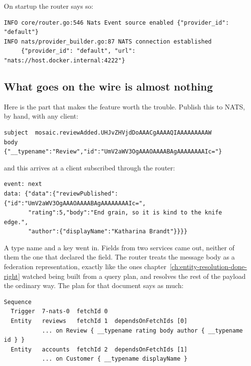 On startup the router says so:

\begin{verbatim}
INFO core/router.go:546 Nats Event source enabled {"provider_id": "default"}
INFO nats/provider_builder.go:87 NATS connection established
     {"provider_id": "default", "url": "nats://host.docker.internal:4222"}
\end{verbatim}

\subsection*{What goes on the wire is almost nothing}

%
Here is the part that makes the feature worth the trouble. Publish this to
NATS, by hand, with any client:

\begin{verbatim}
subject  mosaic.reviewAdded.UHJvZHVjdDoAAACgAAAAQIAAAAAAAAAW
body     {"__typename":"Review","id":"UmV2aWV3OgAAAOAAAABAgAAAAAAAAIc="}
\end{verbatim}

and this arrives at a client subscribed through the router:

\begin{verbatim}
event: next
data: {"data":{"reviewPublished":{"id":"UmV2aWV3OgAAAOAAAABAgAAAAAAAAIc=",
       "rating":5,"body":"End grain, so it is kind to the knife edge.",
       "author":{"displayName":"Katharina Brandt"}}}}
\end{verbatim}

A type name and a key went in. Fields from two services came out, neither of
them the one that declared the field. The router treats the message body as a
federation representation, exactly like the ones
chapter~\ref{ch:entity-resolution-done-right} watched being built from a query
plan, and resolves the rest of the payload the ordinary way. The plan for that
document says as much:

\begin{verbatim}
Sequence
  Trigger  7-nats-0  fetchId 0
  Entity   reviews   fetchId 1  dependsOnFetchIds [0]
           ... on Review { __typename rating body author { __typename id } }
  Entity   accounts  fetchId 2  dependsOnFetchIds [1]
           ... on Customer { __typename displayName }
\end{verbatim}

